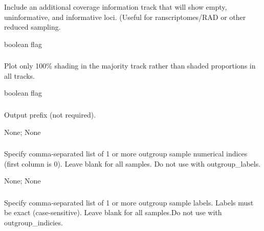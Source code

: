 \documentclass[letterpaper,11pt,english]{sphinxmanual}
\begin{document}
\subsubsection{}
\label{\detokenize{prog_desc:info-track-infotrack}}
 Include an additional coverage information track that will show empty, uninformative, and informative loci. (Useful for ranscriptomes/RAD or other reduced sampling.

 boolean flag


\subsubsection{}
\label{\detokenize{prog_desc:majority}}
 Plot only 100\% shading in the majority track  rather than shaded proportions in all tracks.

 boolean flag


\subsubsection{}
\label{\detokenize{prog_desc:out-prefix-outprefix}}
 Output prefix (not required).

 None;  None


\subsubsection{}
\label{\detokenize{prog_desc:id132}}
 Specify comma-separated list of 1 or more outgroup sample numerical indices (first column is 0). Leave blank for all samples. Do not use with \textendash{}outgroup\_labels.

 None;  None


\subsubsection{}
\label{\detokenize{prog_desc:id133}}
 Specify comma-separated list of 1 or more outgroup sample labels. Labels must be exact (case-sensitive). Leave blank for all samples.Do not use with \textendash{}outgroup\_indicies.
\end{document}
